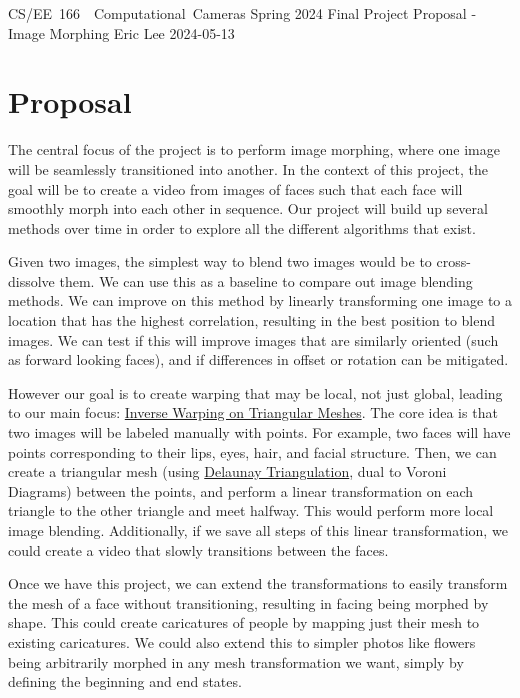 \documentclass[a4paper]{article}
\begin{document}
\problemset
    {CS/EE~166~~Computational~Cameras}
    {Spring 2024}
    {Final Project Proposal - Image Morphing}
    {Eric Lee}
    {2024-05-13}

\section*{Proposal}

The central focus of the project is to perform image morphing, where one image will be seamlessly transitioned into another. In the context of this project, the goal will be to create a video from images of faces such that each face will smoothly morph into each other in sequence. Our project will build up several methods over time in order to explore all the different algorithms that exist.

Given two images, the simplest way to blend two images would be to cross-dissolve them. We can use this as a baseline to compare out image blending methods. We can improve on this method by linearly transforming one image to a location that has the highest correlation, resulting in the best position to blend images. We can test if this will improve images that are similarly oriented (such as forward looking faces), and if differences in offset or rotation can be mitigated.

However our goal is to create warping that may be local, not just global, leading to our main focus: \href{http://graphics.cs.cmu.edu/courses/15-463/2007_fall/Lectures/morphing.pdf}{Inverse Warping on Triangular Meshes}. The core idea is that two images will be labeled manually with points. For example, two faces will have points corresponding to their lips, eyes, hair, and facial structure. Then, we can create a triangular mesh (using \href{https://en.wikipedia.org/wiki/Delaunay_triangulation}{Delaunay Triangulation}, dual to Voroni Diagrams) between the points, and perform a linear transformation on each triangle to the other triangle and meet halfway. This would perform more local image blending. Additionally, if we save all steps of this linear transformation, we could create a video that slowly transitions between the faces.

Once we have this project, we can extend the transformations to easily transform the mesh of a face without transitioning, resulting in facing being morphed by shape. This could create caricatures of people by mapping just their mesh to existing caricatures. We could also extend this to simpler photos like flowers being arbitrarily morphed in any mesh transformation we want, simply by defining the beginning and end states.
\end{document}
